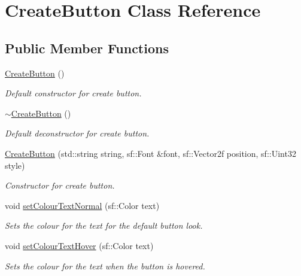 \hypertarget{class_create_button}{}\section{Create\+Button Class Reference}
\label{class_create_button}
\subsection*{Public Member Functions}
\begin{DoxyCompactItemize}
\item 
\mbox{\label{class_create_button_a1655e9e967cc6fd7d170315668737937}} 
\hyperlink{class_create_button_a1655e9e967cc6fd7d170315668737937}{Create\+Button} ()
\begin{DoxyCompactList}\small\item\em Default constructor for create button. \end{DoxyCompactList}\item 
\mbox{\label{class_create_button_a3345a07909846777f48c9beada74939d}} 
\hyperlink{class_create_button_a3345a07909846777f48c9beada74939d}{$\sim$\+Create\+Button} ()
\begin{DoxyCompactList}\small\item\em Default deconstructor for create button. \end{DoxyCompactList}\item 
\hyperlink{class_create_button_a5401dea912167ef552e08e17f9baae16}{Create\+Button} (std\+::string string, sf\+::\+Font \&font, sf\+::\+Vector2f position, sf\+::\+Uint32 style)
\begin{DoxyCompactList}\small\item\em Constructor for create button. \end{DoxyCompactList}\item 
void \hyperlink{class_create_button_a57b583da73b25e161af5a951aa7213c5}{set\+Colour\+Text\+Normal} (sf\+::\+Color text)
\begin{DoxyCompactList}\small\item\em Sets the colour for the text for the default button look. \end{DoxyCompactList}\item 
void \hyperlink{class_create_button_a6249d944f8b4593dae454449adf9cb0a}{set\+Colour\+Text\+Hover} (sf\+::\+Color text)
\begin{DoxyCompactList}\small\item\em Sets the colour for the text when the button is hovered. \end{DoxyCompactList}\item 

\end{DoxyCompactItemize}
